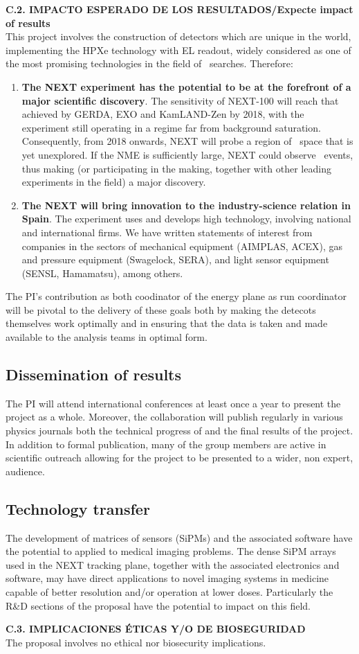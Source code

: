 \documentclass[a4paper,11pt,oneside]{article}
\begin{document}
\noindent\textbf{C.2. IMPACTO ESPERADO DE LOS RESULTADOS/Expecte
  impact of results}\\
This project involves the construction of detectors which are unique in the world, implementing the HPXe technology with EL readout, widely considered as one of the most promising technologies in the field of \bbonu\ searches. Therefore: 
\begin{enumerate}
\item {\bf The NEXT experiment has the potential to be at the
    forefront of a major scientific discovery}. The sensitivity of
  NEXT-100 will reach that achieved by GERDA, EXO and KamLAND-Zen by
  2018, with the experiment still operating in a regime far from
  background saturation. Consequently, from 2018 onwards, NEXT will
  probe a region of \mbb\ space that is yet unexplored. If the NME is
  sufficiently large, NEXT could observe \bbonu\ events, thus making
  (or participating in the making, together with other leading
  experiments in the field) a major discovery.
\item {\bf The NEXT will bring innovation to the industry-science
    relation in Spain}. The experiment uses and develops high
  technology, involving national and international firms. We have
  written statements of interest from companies in the sectors of
  mechanical equipment (AIMPLAS, ACEX), gas and pressure equipment (Swagelock, SERA), and light sensor equipment (SENSL, Hamamatsu), among others.
\end{enumerate}
The PI's contribution as both coodinator of the energy plane as run
coordinator will be pivotal to the delivery of these goals both by
making the detecots themselves work optimally and in ensuring that the
data is taken and made available to the analysis teams in optimal
form.

\subsection*{Dissemination of results}
The PI will attend international conferences at least once a year to
present the project as a whole. Moreover, the collaboration will
publish regularly in various physics journals both the technical
progress of and the final results of the project. In addition to
formal publication, many of the group members are active in scientific
outreach allowing for the project to be presented to a wider, non
expert, audience.

\subsection*{Technology transfer}
The development of matrices of sensors (SiPMs) and the associated
software have the potential to applied to medical imaging
problems. The dense SiPM arrays used in the NEXT tracking plane,
together with the associated electronics and software, may have direct
applications to novel imaging systems in medicine capable of better
resolution and/or operation at lower doses. Particularly the R\&D
sections of the proposal have the potential to impact on this field.


\noindent\textbf{C.3. IMPLICACIONES \'ETICAS Y/O DE BIOSEGURIDAD}\\
The proposal involves no ethical nor biosecurity implications.
\end{document}

